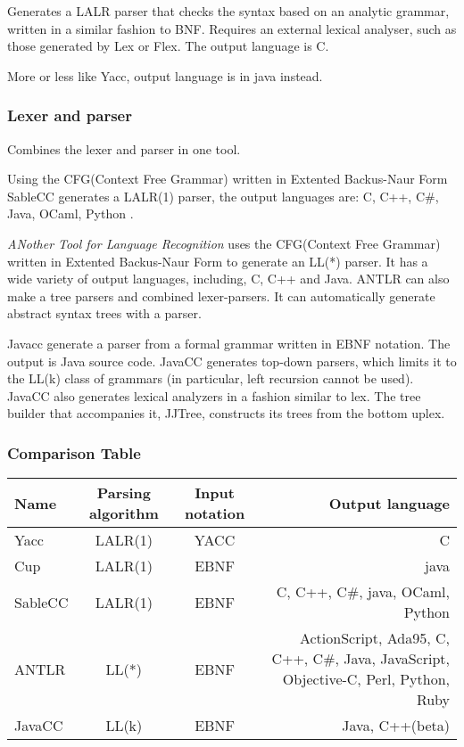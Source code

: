 Generates a LALR parser that checks the syntax based on an analytic grammar, written in a similar fashion to BNF. Requires an external lexical analyser, such as those generated by Lex or Flex. The output language is C. \citep{Yacc}

More or less like Yacc, output language is in java instead. \citep{CUP}

\subsubsection{Lexer and parser}
Combines the lexer and parser in one tool.

Using the CFG(Context Free Grammar) written in Extented Backus-Naur Form SableCC generates a LALR(1) parser, the output languages are: C, C++, C\#, Java, OCaml, Python \citep{SableCC}.

\textit{ANother Tool for Language Recognition} uses the CFG(Context Free Grammar) written in Extented Backus-Naur Form to generate an LL(*) parser. It has a wide variety of output languages, including, C, C++ and Java.
ANTLR can also make a tree parsers and combined lexer-parsers. It can automatically generate abstract syntax trees with a parser. \citep{ANTLR} %


Javacc generate a parser from a formal grammar written in EBNF notation. The output is Java source code. JavaCC generates top-down parsers, which limits it to the LL(k) class of grammars (in particular, left recursion cannot be used). JavaCC also generates lexical analyzers in a fashion similar to lex\citep{Javacc}. The tree builder that accompanies it, JJTree, constructs its trees from the bottom uplex\citep{JJTree}.


\subsubsection{Comparison Table}
\begin{table}[H]
\begin{tabularx}{\textwidth}{|l|c|c|R|}
\hline
\textbf{Name} 	& \textbf{Parsing algorithm} 	& \textbf{Input notation} 	& \textbf{Output language}			\\ \hline
Yacc 			& LALR(1) 						& YACC 						& C									\\ \hline
Cup 			& LALR(1) 						& EBNF 						& java								\\ \hline
SableCC 		& LALR(1) 						& EBNF 						& C, C++, C\#, java, OCaml, Python	\\ \hline
ANTLR 			& LL(*) 						& EBNF 						& ActionScript, Ada95, C, C++, C\#, Java, JavaScript,
																			  Objective-C, Perl, Python, Ruby	\\ \hline
JavaCC 			& LL(k) 						& EBNF 						& Java, C++(beta)					\\ \hline
\end{tabularx}
\end{table}

